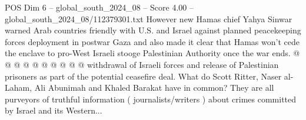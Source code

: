 \begin{textsample}{POS Dim 6 – global\_south\_2024\_08 – Score 4.00 – global\_south\_2024\_08/112379301.txt}
However new Hamas chief Yahya Sinwar warned Arab countries friendly with U.S. and Israel against planned peacekeeping forces deployment in postwar Gaza and also made it clear that Hamas won't cede the enclave to pro-West Israeli stooge Palestinian Authority once the war ends. @ @ @ @ @ @ @ @ @ @ withdrawal of Israeli forces and release of Palestinian prisoners as part of the potential ceasefire deal.
What do Scott Ritter, Naser al-Laham, Ali Abunimah and Khaled Barakat have in common?
They are all purveyors of truthful information ( journalists/writers ) about crimes committed by Israel and its Western...

\end{textsample}
